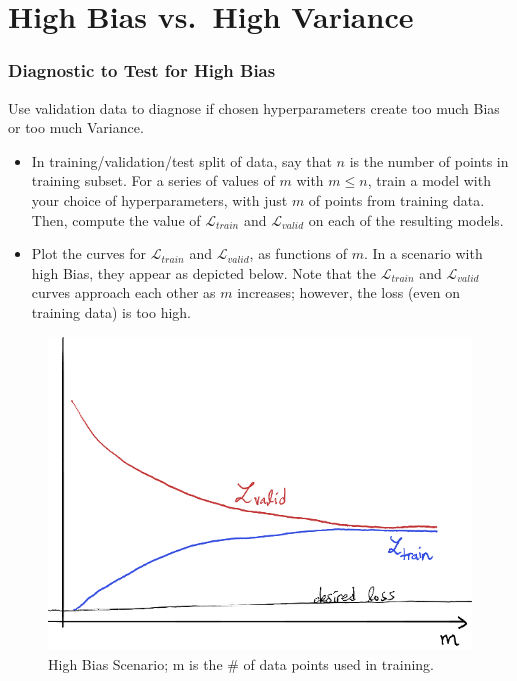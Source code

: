 \documentclass[smaller]{beamer}
\theoremstyle{example}
\begin{document}
\section{High Bias vs.\ High Variance}

\begin{frame}
    \frametitle{Diagnostic to Test for High Bias}
    Use validation data to diagnose if chosen hyperparameters create too much Bias or too much Variance. 
    \vfill 

    \pause
    \begin{itemize}
        \item In training/validation/test split of data, say that $n$ is the number of points in training subset. For a series of values of $m$ with $m\le n$, train a model with your choice of hyperparameters, with just $m$ of points from training data. Then, compute the value of $\mathcal L_{train}$ and $\mathcal L_{valid}$ on each of the resulting models.

        \pause
        \item Plot the curves for $\mathcal L_{train}$ and $\mathcal L_{valid}$, as functions of $m$. In a scenario with high Bias, they appear as depicted below. Note that the $\mathcal L_{train}$ and $\mathcal L_{valid}$ curves approach each other as $m$ increases; however, the loss (even on training data) is too high. 
    \end{itemize}

    \begin{figure}
        \begin{center}
        \includegraphics[height=0.3\textheight]{../../Images/high-bias-schematic.png}
        \end{center}
        \caption{High Bias Scenario; m is the \# of data points used in training.}
    \end{figure}
\end{frame}
\end{document}
